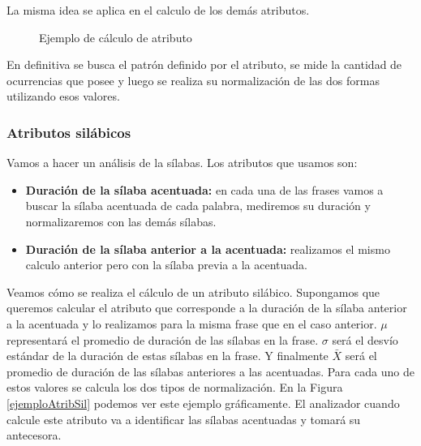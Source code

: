 La misma idea se aplica en el calculo de los demás atributos.

\begin{figure}[H]
\centering
{}
\caption{Ejemplo de cálculo de atributo}
\label{ejemploAtribFon}
\end{figure}

En definitiva se busca el patrón definido por el atributo, se mide la cantidad de ocurrencias que posee y luego se realiza su normalización de las dos formas utilizando esos valores. 

\subsubsection{Atributos silábicos}

Vamos a hacer un análisis de la sílabas. Los atributos que usamos son:

\begin{itemize}
    \item \textbf{Duración de la sílaba acentuada:} en cada una de las frases vamos a buscar la sílaba acentuada de cada palabra, mediremos su duración y normalizaremos con las demás sílabas.
    \item \textbf{Duración de la sílaba anterior a la acentuada:} realizamos el mismo calculo anterior pero con la sílaba previa a la acentuada. 
\end{itemize}

Veamos cómo se realiza el cálculo de un atributo silábico. Supongamos que queremos calcular el atributo que corresponde a la duración de la sílaba anterior a la acentuada y lo realizamos para la misma frase que en el caso anterior. $\mu$ representará el promedio de duración de las sílabas en la frase. $\sigma$ será el desvío estándar de la duración de estas sílabas en la frase. Y finalmente $\bar{X}$ será el promedio de duración de las sílabas anteriores a las acentuadas. Para cada uno de estos valores se calcula los dos tipos de normalización. En la Figura \ref{ejemploAtribSil} podemos ver este ejemplo gráficamente. El analizador cuando calcule este atributo va a identificar las sílabas acentuadas y tomará su antecesora. 

